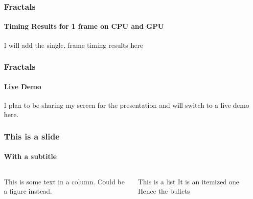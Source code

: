 \documentclass[aspectratio=169]{beamer}
\begin{document}
\begin{frame}
	\frametitle{Fractals}
	\framesubtitle{Timing Results for 1 frame on CPU and GPU}

	I will add the single, frame timing results here
\end{frame}

\begin{frame}
	\frametitle{Fractals}
	\framesubtitle{Live Demo}

	I plan to be sharing my screen for the presentation and will switch to a live demo here.
\end{frame}

\begin{frame}
	\frametitle{This is a slide}
	\framesubtitle{With a subtitle}

	\begin{columns}
		\begin{column}{0.6\textwidth}
			This is some text in a column. Could be a figure instead.
		\end{column}
		\begin{column}{0.4\textwidth}
			\begin{outline}[itemize]
				\1
				This is a list
				\1
				It is an itemized one
				\1
				Hence the bullets
			\end{outline}
		\end{column}
	\end{columns}
\end{frame}

%     


\end{document}
